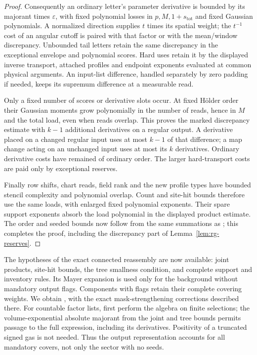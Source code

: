 \begin{proof}
Consequently an ordinary letter's parameter derivative is bounded by
its majorant times $\varepsilon$, with fixed polynomial losses in
$p,M,1+s_{\mathrm{tot}}$ and fixed Gaussian polynomials.  A normalized
direction supplies $t$ times its spatial weight; the $t^{-1}$ cost of
an angular cutoff is paired with that factor or with the mean/window
discrepancy.  Unbounded tail letters retain the same discrepancy in
the exceptional envelope and polynomial scores.  Hard uses retain it
by the displayed inverse transport, attached profiles and endpoint
exponents evaluated at common physical arguments.  An input-list
difference, handled separately by zero padding if needed, keeps its
supremum difference at a measurable read.

Only a fixed number of scores or derivative slots occur.  At fixed
H\"older order their Gaussian moments grow polynomially in the
number of reads, hence in $M$ and the total load, even when reads
overlap.  This proves the marked discrepancy estimate with $k-1$
additional derivatives on a regular output.  A derivative placed on
a changed regular input uses at most $k-1$ of that difference; a map
change acting on an unchanged input uses at most its $k$ derivatives.
Ordinary derivative costs have remained of ordinary order.  The
larger hard-transport costs are paid only by exceptional reserves.

Finally row shifts, chart reads, field rank and the new profile types
have bounded stencil complexity and polynomial overlap.  Count and
site-hit bounds therefore use the same loads, with enlarged fixed
polynomial exponents.  Their spare support exponents absorb the
load polynomial in the displayed product estimate.  The order and
seeded bounds now follow from the same summations as
; this completes the proof, including the discrepancy
part of Lemma~\ref{lem:rg-reserves}.
\end{proof}

The hypotheses of the exact connected reassembly
 are now available: joint products, site-hit bounds,
the tree smallness condition, and complete support and inventory
rules.  Its Mayer expansion is used only for the background without
mandatory output flags.  Components with flags retain their complete
covering weights.  We obtain , with the
exact mask-strengthening corrections described there.  For countable
factor lists, first perform the algebra on finite selections; the
volume-exponential absolute majorant from the joint and tree bounds
permits passage to the full expression, including its derivatives.
Positivity of a truncated signed gas is not needed.  Thus the output
representation accounts for all mandatory covers, not only the
sector with no seeds.

